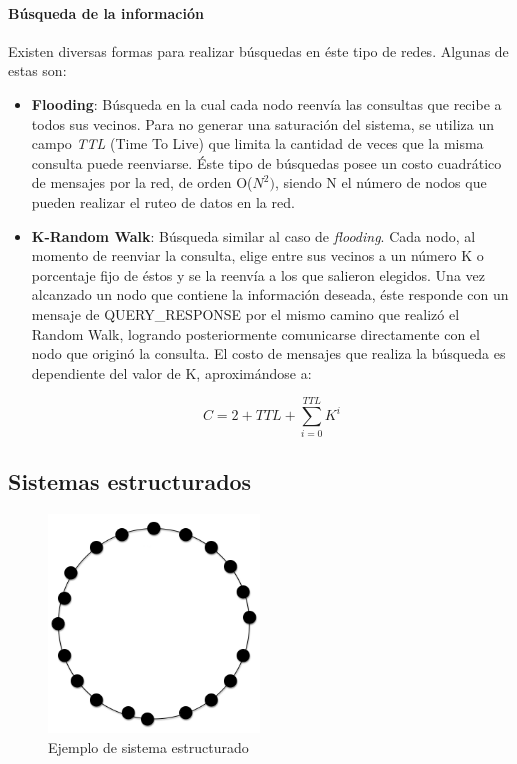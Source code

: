 \paragraph{Búsqueda de la información}
\label{sec:p2p_unstructured_search}
Existen diversas formas para realizar búsquedas en éste tipo de redes. Algunas
de estas son:
\begin{itemize}
    \item \textbf{Flooding}: Búsqueda en la cual cada nodo reenvía las
consultas que recibe a todos sus vecinos. Para no generar una saturación del
sistema, se utiliza un campo \textit{TTL} (Time To Live) que limita la cantidad
de veces que la misma consulta puede reenviarse. Éste tipo de búsquedas posee
un costo cuadrático de mensajes por la red, de orden O($N^2)$, siendo N el
número de nodos que pueden realizar el ruteo de datos en la red.
    \item \textbf{K-Random Walk}: Búsqueda similar al caso de
\textit{flooding}. Cada nodo, al momento de reenviar la consulta, elige entre sus vecinos a un número K o porcentaje
fijo de éstos y se la reenvía a los que salieron elegidos. Una vez alcanzado un
nodo que contiene la información deseada, éste responde con un mensaje de
QUERY\_RESPONSE por el mismo camino que realizó el Random Walk, logrando
posteriormente comunicarse directamente con el nodo que originó la consulta.
El costo de mensajes que realiza la búsqueda es dependiente del valor de K,
aproximándose a: %

\begin{equation}
\label{eq:krandomwalk}
 C = 2 + TTL +
\sum_{i=0}^{TTL} K^i
\end{equation}

\end{itemize}


\subsection{Sistemas estructurados}
\label{sec:p2p_estructured}

\begin{figure}
\center
\includegraphics[width=0.5\textwidth]{img/p2p-structured}
\caption{Ejemplo de sistema estructurado}
\label{fig:p2p_estructured}
\end{figure}


